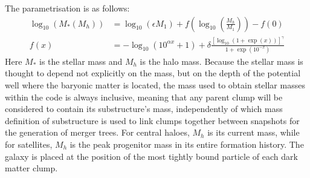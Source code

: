 The parametrisation is as follows:
%
\begin{align}
    \log_{10}(M_*(M_h)) &= 
    \log_{10}(\epsilon M_1) + 
    f \left(\log_{10} \left( \frac{M_h}{M_1} \right) \right) - f(0)
    \label{eq:behroozi_SMHM} \\
    f(x) &= -\log_{10}(10^{\alpha x} + 1) + 
    \delta \frac{ [\log_{10}(1+\exp(x))]^\gamma }{1 + \exp(10^{-x})}
    \label{eq:behroozi_fx}
\end{align}
%
Here $M_*$ is the stellar mass and $M_h$ is the halo mass.
Because the stellar mass is thought to depend not explicitly on the mass, but on the depth of the potential well where the baryonic matter is located, the mass used to obtain stellar masses within the code is always inclusive, meaning that any parent clump will be considered to contain its substructure's mass, independently of which mass definition of substructure is used to link clumps together between snapshots for the generation of merger trees.
For central haloes, $M_h$ is its current mass, while for satellites, $M_h$ is the peak progenitor mass in its entire formation history.
The galaxy is placed at the position of the most tightly bound particle of each dark matter clump.

